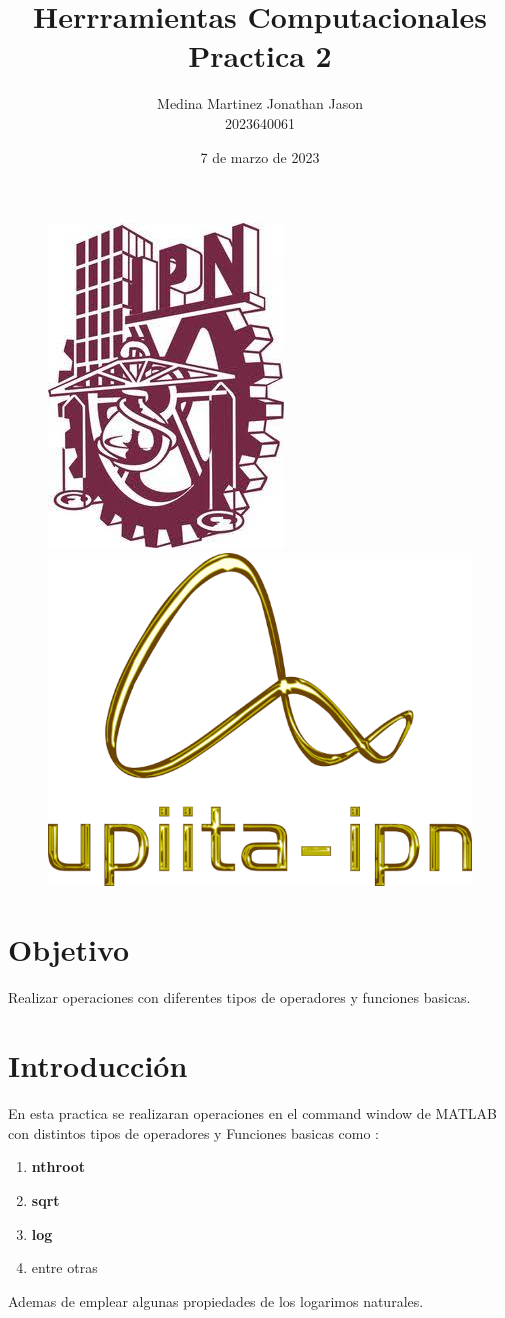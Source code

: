 \documentclass{article}
\title{Herrramientas Computacionales \\ Practica 2}
\author{Medina Martinez Jonathan Jason \\ 2023640061}
\date{7 de marzo de 2023}
\begin{document}

\fontsize{12}{14}\selectfont

\begin{figure}[t] %

\includegraphics[width=2.5 cm]{Logo1.jpeg}
\hfill
\includegraphics[width=3 cm]{Logo2.png}

\end{figure}

\maketitle %
\newpage

\tableofcontents %
\newpage

\section{Objetivo}

Realizar operaciones con diferentes tipos de operadores y funciones basicas.

\section{Introducción}

En esta practica se realizaran operaciones en el command window de MATLAB con distintos tipos de operadores y Funciones basicas como :
\begin{enumerate}
    \item \textbf{nthroot}
    \item \textbf{sqrt}
    \item \textbf{log}
    \item entre otras
\end{enumerate}

Ademas de emplear algunas propiedades de los logarimos naturales.
\end{document}
